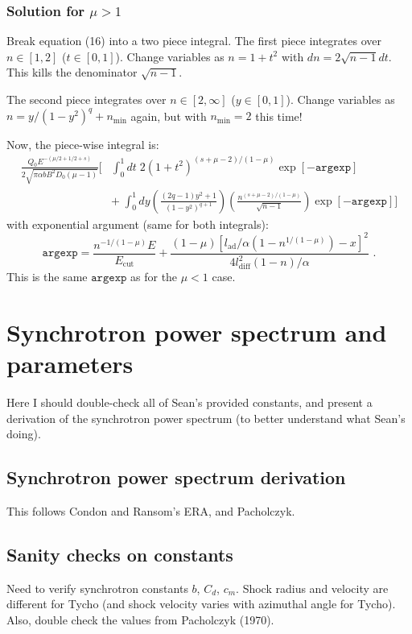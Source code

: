 \documentclass[10pt]{article}
\newcommand{\mt}{\mathrm}
\begin{document}
\subsubsection{Solution for \texorpdfstring{$\mu > 1$}{mu gt 1}}
Break equation (16) into a two piece integral.
The first piece integrates over $n\in[1,2]$ ($t\in[0,1]$).
Change variables as $n=1+t^2$ with $dn = 2\sqrt{n-1} dt$.
This kills the denominator $\sqrt{n-1}$.

The second piece integrates over $n\in[2,\infty]$ ($y\in[0,1]$).
Change variables as $n = y / (1-y^2)^q + n_{\mt{min}}$ again,
but with $n_{\mt{min}} = 2$ this time!

Now, the piece-wise integral is:
\begin{align*}
    \frac{Q_0 E^{-(\mu/2 + 1/2 + s)}}
         {2 \sqrt{\pi\alpha b B^2 D_0 (\mu-1)}}
    \biggl[
        &\int_0^1 dt \; 2 (1+t^2)^{(s+\mu-2)/(1-\mu)} \exp [ -\mathtt{argexp} ]
        \\
        & +\;
        \int_0^1 dy \left(\frac{(2q-1) y^2 + 1}{(1-y^2)^{q+1}}\right)
                    \left(\frac{n^{(s+\mu-2)/(1-\mu)}}{\sqrt{n-1}}\right)
                    \exp[ - \mathtt{argexp}]
    \biggr]
\end{align*}
with exponential argument (same for both integrals):
\[
    \mathtt{argexp} = \frac{n^{-1/(1-\mu)} E}{E_{\mt{cut}}}
    + \frac{(1 - \mu)
        \left[ l_{\mt{ad}}/\alpha \left(1 - n^{1/(1-\mu)}\right) - x \right]^2}
        {4 l_{\mt{diff}}^2 (1-n) / \alpha}
    \text{ .}
\]
This is the same $\mathtt{argexp}$ as for the $\mu < 1$ case.


\section{Synchrotron power spectrum and parameters}

Here I should double-check all of Sean's provided constants, and
present a derivation of the synchrotron power spectrum (to better understand
what Sean's doing).

\subsection{Synchrotron power spectrum derivation}

This follows Condon and Ransom's ERA, and Pacholczyk.

\subsection{Sanity checks on constants}

Need to verify synchrotron constants $b$, $C_d$, $c_m$.  Shock radius and
velocity are different for Tycho (and shock velocity varies with azimuthal
angle for Tycho).  Also, double check the values from Pacholczyk (1970).
\end{document}
